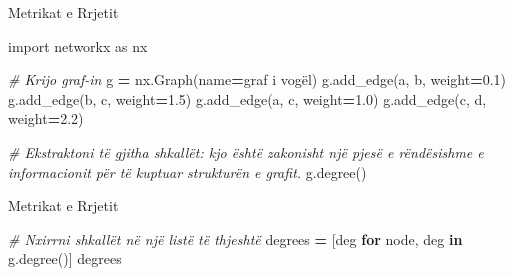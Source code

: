 \documentclass[
  ignorenonframetext,
]{beamer}
\newenvironment{Shaded}{\begin{snugshade}}{\end{snugshade}}
\newcommand{\CommentTok}[1]{\textcolor[rgb]{0.56,0.35,0.01}{\textit{#1}}}
\newcommand{\ControlFlowTok}[1]{\textcolor[rgb]{0.13,0.29,0.53}{\textbf{#1}}}
\newcommand{\FloatTok}[1]{\textcolor[rgb]{0.00,0.00,0.81}{#1}}
\newcommand{\ImportTok}[1]{#1}
\newcommand{\KeywordTok}[1]{\textcolor[rgb]{0.13,0.29,0.53}{\textbf{#1}}}
\newcommand{\NormalTok}[1]{#1}
\newcommand{\OperatorTok}[1]{\textcolor[rgb]{0.81,0.36,0.00}{\textbf{#1}}}
\newcommand{\StringTok}[1]{\textcolor[rgb]{0.31,0.60,0.02}{#1}}
\begin{document}
\begin{frame}[fragile]{Metrikat e Rrjetit}
\protect\hypertarget{metrikat-e-rrjetit-4}{}

\begin{Shaded}
\begin{Highlighting}[]
\ImportTok{import}\NormalTok{ networkx }\ImportTok{as}\NormalTok{ nx}

\CommentTok{\# Krijo graf{-}in}
\NormalTok{g }\OperatorTok{=}\NormalTok{ nx.Graph(name}\OperatorTok{=}\StringTok{\textquotesingle{}graf i vogël\textquotesingle{}}\NormalTok{)}
\NormalTok{g.add\_edge(}\StringTok{\textquotesingle{}a\textquotesingle{}}\NormalTok{, }\StringTok{\textquotesingle{}b\textquotesingle{}}\NormalTok{, weight}\OperatorTok{=}\FloatTok{0.1}\NormalTok{)}
\NormalTok{g.add\_edge(}\StringTok{\textquotesingle{}b\textquotesingle{}}\NormalTok{, }\StringTok{\textquotesingle{}c\textquotesingle{}}\NormalTok{, weight}\OperatorTok{=}\FloatTok{1.5}\NormalTok{)}
\NormalTok{g.add\_edge(}\StringTok{\textquotesingle{}a\textquotesingle{}}\NormalTok{, }\StringTok{\textquotesingle{}c\textquotesingle{}}\NormalTok{, weight}\OperatorTok{=}\FloatTok{1.0}\NormalTok{)}
\NormalTok{g.add\_edge(}\StringTok{\textquotesingle{}c\textquotesingle{}}\NormalTok{, }\StringTok{\textquotesingle{}d\textquotesingle{}}\NormalTok{, weight}\OperatorTok{=}\FloatTok{2.2}\NormalTok{)}

\CommentTok{\# Ekstraktoni të gjitha shkallët: kjo është zakonisht një pjesë e rëndësishme e informacionit për të kuptuar strukturën e grafit.}
\NormalTok{g.degree()}
\end{Highlighting}
\end{Shaded}
\end{frame}

\begin{frame}[fragile]{Metrikat e Rrjetit}
\protect\hypertarget{metrikat-e-rrjetit-5}{}

\begin{Shaded}
\begin{Highlighting}[]
\CommentTok{\# Nxirrni shkallët në një listë të thjeshtë}
\NormalTok{degrees }\OperatorTok{=}\NormalTok{ [deg }\ControlFlowTok{for}\NormalTok{ node, deg }\KeywordTok{in}\NormalTok{ g.degree()]}
\NormalTok{degrees}
\end{Highlighting}
\end{Shaded}
\end{frame}
\end{document}
